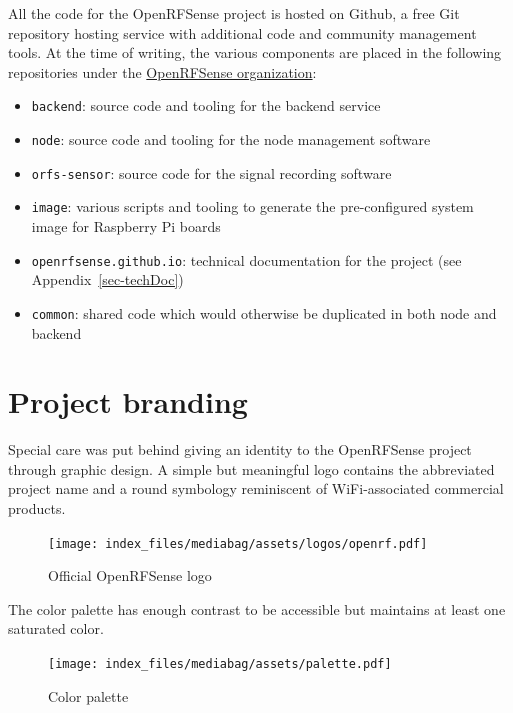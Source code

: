 \documentclass[
  letterpaper,
  a4paper,
  12pt,
  titlepage,
  oneside,
  openany]{book}
\providecommand{\tightlist}{%
  \setlength{\itemsep}{0pt}\setlength{\parskip}{0pt}}\usepackage{longtable,booktabs,array}
\begin{document}
All the code for the OpenRFSense project is hosted on Github, a free Git
repository hosting service with additional code and community management
tools. At the time of writing, the various components are placed in the
following repositories under the
\href{https://github.com/openrfsense}{OpenRFSense organization}:

\begin{itemize}
\tightlist
\item
  \texttt{backend}: source code and tooling for the backend service
\item
  \texttt{node}: source code and tooling for the node management
  software
\item
  \texttt{orfs-sensor}: source code for the signal recording software
\item
  \texttt{image}: various scripts and tooling to generate the
  pre-configured system image for Raspberry Pi boards
\item
  \texttt{openrfsense.github.io}: technical documentation for the
  project (see Appendix~\ref{sec-techDoc})
\item
  \texttt{common}: shared code which would otherwise be duplicated in
  both node and backend
\end{itemize}


\hypertarget{project-branding}{%
\chapter{Project branding}\label{project-branding}}

Special care was put behind giving an identity to the OpenRFSense
project through graphic design. A simple but meaningful logo contains
the abbreviated project name and a round symbology reminiscent of
WiFi-associated commercial products.

\begin{figure}[h!]

{\centering \texttt{[image: index\_files/mediabag/assets/logos/openrf.pdf]}

}

\caption{Official OpenRFSense logo}

\end{figure}

The color palette has enough contrast to be accessible but maintains at
least one saturated color.

\begin{figure}[h!]

{\centering \texttt{[image: index\_files/mediabag/assets/palette.pdf]}

}

\caption{Color palette}

\end{figure}
\end{document}

